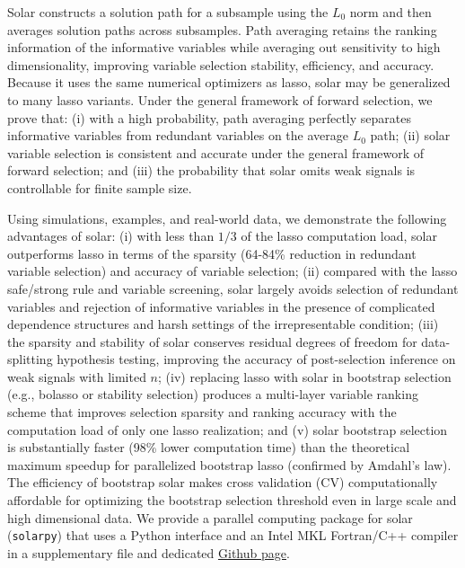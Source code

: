 \documentclass[11pt,review,authoryear]{elsarticle}
\begin{document}
Solar constructs a solution path for a subsample using the $L_0$ norm and then averages solution paths across subsamples. Path averaging retains the ranking information of the informative variables while averaging out sensitivity to high dimensionality, improving variable selection stability, efficiency, and accuracy. Because it uses the same numerical optimizers as lasso, solar may be generalized to many lasso variants. Under the \citet{zhang09} general framework of forward selection, we prove that: (i) with a high probability, path averaging perfectly separates informative variables from redundant variables on the average $L_0$ path; (ii) solar variable selection is consistent and accurate under the general framework of forward selection; and (iii) the probability that solar omits weak signals is controllable for finite sample size.

Using simulations, examples, and real-world data, we demonstrate the following advantages of solar: (i) with less than $1/3$ of the lasso computation load, solar outperforms lasso in terms of the sparsity (64-84\% reduction in redundant variable selection) and accuracy of variable selection; (ii) compared with the lasso safe/strong rule and variable screening, solar largely avoids selection of redundant variables and rejection of informative variables in the presence of complicated dependence structures and harsh settings of the irrepresentable condition; (iii) the sparsity and stability of solar conserves residual degrees of freedom for data-splitting hypothesis testing, improving the accuracy of post-selection inference on weak signals with limited $n$; (iv) replacing lasso with solar in bootstrap selection (e.g., bolasso or stability selection) produces a multi-layer variable ranking scheme that improves selection sparsity and ranking accuracy with the computation load of only one lasso realization; and (v) solar bootstrap selection is substantially faster (98\% lower computation time) than the theoretical maximum speedup for parallelized bootstrap lasso (confirmed by Amdahl's law). The efficiency of bootstrap solar makes cross validation (CV) computationally affordable for optimizing the bootstrap selection threshold even in large scale and high dimensional data. We provide a parallel computing package for solar (\texttt{solarpy}) that uses a Python interface and an Intel MKL Fortran/C++ compiler in a supplementary file and dedicated \href{https://github.com/isaac2math/solarpy}{Github page}.
\end{document}
